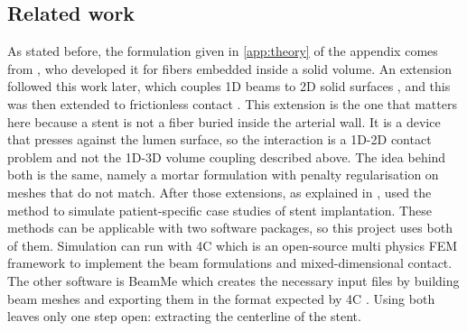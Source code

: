 \subsection{Related work}
\label{sec:related-work}
As stated before, the formulation given in \cref{app:theory} of the appendix comes from \citet{steinbrecher2020}, who developed it for fibers embedded inside a solid volume. An extension followed this work later, which couples 1D beams to 2D solid surfaces \citep{steinbrecher2022surf}, and this was then extended to frictionless contact \citep{steinbrecher2021thesis}. This extension is the one that matters here because a stent is not a fiber buried inside the arterial wall. It is a device that presses against the lumen surface, so the interaction is a 1D-2D contact problem and not the 1D-3D volume coupling described above. The idea behind both is the same, namely a mortar formulation with penalty regularisation on meshes that do not match. After those extensions, as explained in , \citet{datz2025, ranno2025} used the method to simulate patient-specific case studies of stent implantation. These methods can be applicable with two software packages, so this project uses both of them. Simulation can run with 4C which is an open-source multi physics FEM framework to implement the beam formulations and mixed-dimensional contact. The other software is BeamMe which creates the necessary input files by building beam meshes and exporting them in the format expected by 4C \citep{beamme}. Using both leaves only one step open: extracting the centerline of the stent. 
